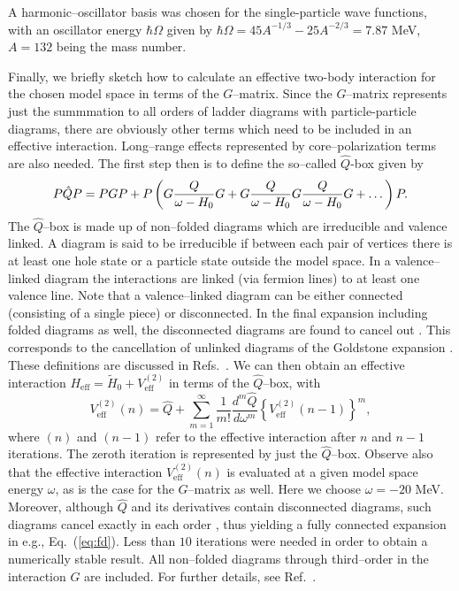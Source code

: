 A harmonic--oscillator basis was chosen for the
single-particle
wave functions, with an oscillator energy $\hbar\Omega$ given
by
$\hbar\Omega = 45A^{-1/3} - 25A^{-2/3}=7.87 $ MeV,  $A=132$ being the mass
number.

Finally, we briefly sketch how to calculate an effective 
two-body interaction for the chosen model space
in terms of the $G$--matrix.  Since the $G$--matrix represents just
the summmation to all orders of ladder diagrams with particle-particle
diagrams, there are obviously other terms which need to be included
in an effective interaction. Long--range effects represented by 
core--polarization terms are also needed.
The first step then is to define the so--called $\hat{Q}$-box given by
\begin{equation}
   P\hat{Q}P=PGP +
   P\left(G\frac{Q}{\omega-H_{0}}G\\ + G
   \frac{Q}{\omega-H_{0}}G \frac{Q}{\omega-H_{0}}G +\dots\right)P.
   \label{eq:qbox}
\end{equation}
The $\hat{Q}$--box is made up of non--folded diagrams which are irreducible
and valence linked. A diagram is said to be irreducible if between each pair
of vertices there is at least one hole state or a particle state outside
the model space. In a valence--linked diagram the interactions are linked
(via fermion lines) to at least one valence line. Note that a valence--linked
diagram can be either connected (consisting of a single piece) or
disconnected. In the final expansion including folded diagrams as well, the
disconnected diagrams are found to cancel out \cite{ko90}.
This corresponds to the cancellation of unlinked diagrams
of the Goldstone expansion \cite{ko90}.
These definitions are discussed in Refs.\ \cite{hko95,ko90}.
We can then obtain an effective interaction
$H_{\mathrm{eff}}=\tilde{H}_0+V_{\mathrm{eff}}^{(2)}$ in terms of the $\hat{Q}$--box,
with \cite{hko95,ko90}
\begin{equation}
    V_{\mathrm{eff}}^{(2)}(n)=\hat{Q}+{\displaystyle\sum_{m=1}^{\infty}}
    \frac{1}{m!}\frac{d^m\hat{Q}}{d\omega^m}\left\{
    V_{\mathrm{eff}}^{(2)}(n-1)\right\}^m,
    \label{eq:fd}
\end{equation}
where $(n)$ and $(n-1)$ refer to the effective interaction after
$n$ and $n-1$ iterations. The zeroth iteration is represented by just the 
$\hat{Q}$--box.
Observe also that the
effective interaction $V_{\mathrm{eff}}^{(2)}(n)$
is evaluated at a given model space energy
$\omega$, as is the case for the $G$--matrix as well. Here we choose
$\omega =-20$ MeV.
Moreover, although $\hat{Q}$ and its derivatives contain disconnected
diagrams, such diagrams cancel exactly in each order \cite{ko90}, thus
yielding a fully connected expansion in e.g., Eq.\ (\ref{eq:fd}).
Less than $10$ iterations were needed in order to obtain a numerically
stable result. All non--folded diagrams through 
third--order in the interaction $G$ are included.
For further details, see Ref.\ \cite{hko95}.


